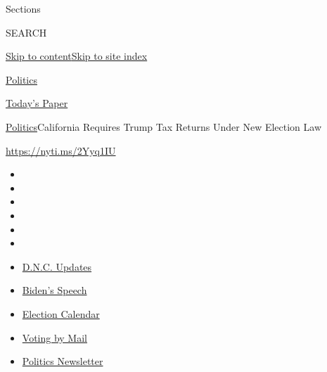 Sections

SEARCH

\protect\hyperlink{site-content}{Skip to
content}\protect\hyperlink{site-index}{Skip to site index}

\href{https://www.nytimes3xbfgragh.onion/section/politics}{Politics}

\href{https://myaccount.nytimes3xbfgragh.onion/auth/login?response_type=cookie\&client_id=vi}{}

\href{https://www.nytimes3xbfgragh.onion/section/todayspaper}{Today's
Paper}

\href{/section/politics}{Politics}\textbar{}California Requires Trump
Tax Returns Under New Election Law

\url{https://nyti.ms/2Yyq1IU}

\begin{itemize}
\item
\item
\item
\item
\item
\item
\end{itemize}

\begin{itemize}
\item
  \href{https://www.nytimes3xbfgragh.onion/live/2020/08/20/us/dnc-convention-election?action=click\&pgtype=Article\&state=default\&region=TOP_BANNER\&context=storylines_menu}{D.N.C.
  Updates}
\item
  \href{https://www.nytimes3xbfgragh.onion/2020/08/20/us/politics/biden-presidential-nomination-dnc.html?action=click\&pgtype=Article\&state=default\&region=TOP_BANNER\&context=storylines_menu}{Biden's
  Speech}
\item
  \href{https://www.nytimes3xbfgragh.onion/interactive/2019/us/elections/2020-presidential-election-calendar.html?action=click\&pgtype=Article\&state=default\&region=TOP_BANNER\&context=storylines_menu}{Election
  Calendar}
\item
  \href{https://www.nytimes3xbfgragh.onion/interactive/2020/08/11/us/politics/vote-by-mail-us-states.html?action=click\&pgtype=Article\&state=default\&region=TOP_BANNER\&context=storylines_menu}{Voting
  by Mail}
\item
  \href{https://www.nytimes3xbfgragh.onion/newsletters/politics?action=click\&pgtype=Article\&state=default\&region=TOP_BANNER\&context=storylines_menu}{Politics
  Newsletter}
\end{itemize}

